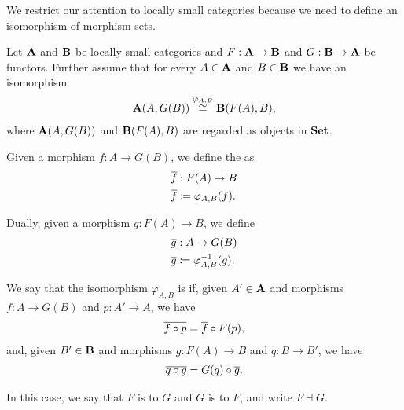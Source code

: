\begin{note}
  We restrict our attention to locally small categories because we need to define an isomorphism of morphism sets.
\end{note}
\begin{definition}\label{def:adjoint_functor}\cite[definition 2.1.1]{Leinster2014}
  Let \( \operatorname{\mathbf{A}} \) and \( \operatorname{\mathbf{B}} \) be locally small categories and \( F: \operatorname{\mathbf{A}} \to \operatorname{\mathbf{B}} \) and \( G: \operatorname{\mathbf{B}} \to \operatorname{\mathbf{A}} \) be functors. Further assume that for every \( A \in \operatorname{\mathbf{A}} \) and \( B \in \operatorname{\mathbf{B}} \) we have an isomorphism
  \begin{align*}
    \operatorname{\mathbf{A}}(A, G(B)) \overset {\varphi_{A, B}} {\cong} \operatorname{\mathbf{B}}(F(A), B),
  \end{align*}
  where \( \operatorname{\mathbf{A}}(A, G(B)) \) and \( \operatorname{\mathbf{B}}(F(A), B) \) are regarded as objects in \( \operatorname{\mathbf{Set}} \).

  Given a morphism \( f: A \to G(B) \), we define the  as
  \begin{align*}
    &\overline{f}: F(A) \to B \\
    &\overline{f} \coloneqq \varphi_{A, B} (f).
  \end{align*}

  Dually, given a morphism \( g: F(A) \to B \), we define
  \begin{align*}
    &\overline{g}: A \to G(B) \\
    &\overline{g} \coloneqq \varphi_{A, B}^{-1} (g).
  \end{align*}

  We say that the isomorphism \( \varphi_{A, B} \) is  if,  given \( A' \in \operatorname{\mathbf{A}} \) and morphisms \( f: A \to G(B) \) and \( p: A' \to A \), we have
  \begin{align*}
    \overline{f \circ p} = \overline{f} \circ F(p),
  \end{align*}
  and, given \( B' \in \operatorname{\mathbf{B}} \) and morphisms \( g: F(A) \to B \) and \( q: B \to B' \), we have
  \begin{align*}
    \overline{q \circ g} = G(q) \circ \overline{g}.
  \end{align*}

  In this case, we say that \( F \) is  to \( G \) and \( G \) is  to \( F \), and write \( F \dashv G \).
\end{definition}

